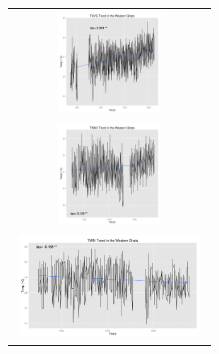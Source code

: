 \documentclass{article}
\begin{document}
\begin{minipage}{\linewidth}
\centering
 
\label{tab:name}
 \begin{tabular}{@{}c@{ }}
    \includegraphics[width=5cm,height=2.7cm]{TAVG.png}\\
    \includegraphics[width=5cm,height=2.7cm]{TMAX.png}\\
    \includegraphics[width=5cm,height=2.7cm]{TMIN.png}\\
                    
  \end{tabular}

  \end{minipage} 
 
 
\end{document}
